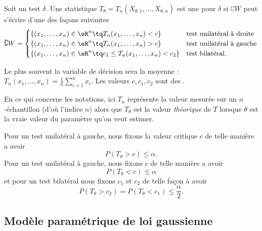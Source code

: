 Soit un test \( \delta\). Une statistique \( T_{\theta}=T_n(X_{\theta,1},\ldots,X_{\theta,n})\) est une  pour \( \delta\) si \( \complement W\) peut s'écrire d'une des façons suivantes
\begin{equation}
    \complement W=\begin{cases}
        \{ (x_1,\ldots,x_n)\in\eR^n\tq T_n(x_1,\ldots,x_n)<c \}     &\text{test unilatéral à droite}  \\
        \{ (x_1,\ldots,x_n)\in\eR^n\tq T_n(x_1,\ldots,x_n)>c \}   &\text{test unilatéral à gauche} \\
        \{ (x_1,\ldots,x_n)\in\eR^n\tq c_1\leq T_n(x_1,\ldots,x_n)<c_2 \}   &\text{test bilatéral}.
    \end{cases}
\end{equation}

Le plus souvent la variable de décision sera la moyenne : \( T_n(x_1,\ldots,x_n)=\frac{1}{ n }\sum_{i=1}^nx_i\). Les valeurs \( c,c_1,c_2\) sont des .

En ce qui concerne les notations, ici \( T_n\) représente la valeur mesurée sur un \( n\)-échantillon (d'où l'indice \( n\)) alors que \( T_{\theta}\) est la valeur \emph{théorique} de \( T\) lorsque \( \theta\) est la vraie valeur du paramètre qu'on veut estimer.

Pour un test unilatéral à gauche, nous fixons la valeur critique \( c\) de telle manière a avoir
\begin{equation}
    P(T_{\theta}>c)\leq \alpha.
\end{equation}
Pour un test unilatéral à gauche, nous fixons \( c\) de telle manière a avoir
\begin{equation}
    P(T_{\theta}<c)\leq \alpha
\end{equation}
et pour un test bilatéral nous fixons \( c_1\) et \( c_2\) de telle façon à avoir
\begin{equation}
    P(T_{\theta}>c_2)=P(T_{\theta}<c_1)\leq\frac{ \alpha }{2}.
\end{equation}

\subsection{Modèle paramétrique de loi gaussienne}

